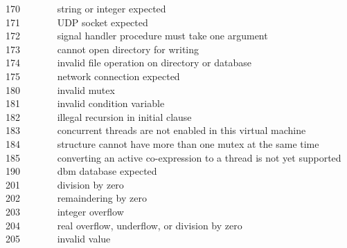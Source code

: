 170 \ \ \ \ \ \ \ string or integer expected\\
171 \ \ \ \ \ \ \ UDP socket expected\\
172 \ \ \ \ \ \ \ signal handler procedure must take one argument\\
173 \ \ \ \ \ \ \ cannot open directory for writing\\
174 \ \ \ \ \ \ \ invalid file operation on directory or database\\
175 \ \ \ \ \ \ \ network connection expected\\
180 \ \ \ \ \ \ \ invalid mutex\\
181 \ \ \ \ \ \ \ invalid condition variable\\
182 \ \ \ \ \ \ \ illegal recursion in initial clause\\
183 \ \ \ \ \ \ \ concurrent threads are not enabled in
this virtual machine\\
184 \ \ \ \ \ \ \ structure cannot have more than one mutex at 
the same time\\
185 \ \ \ \ \ \ \ converting an active co-expression to a thread
is not yet supported\\
190 \ \ \ \ \ \ \ dbm database expected\\
201 \ \ \ \ \ \ \ division by zero\\
202 \ \ \ \ \ \ \ remaindering by zero\\
203 \ \ \ \ \ \ \ integer overflow\\
204 \ \ \ \ \ \ \ real overflow, underflow, or division by zero\\
205 \ \ \ \ \ \ \ invalid value\\

